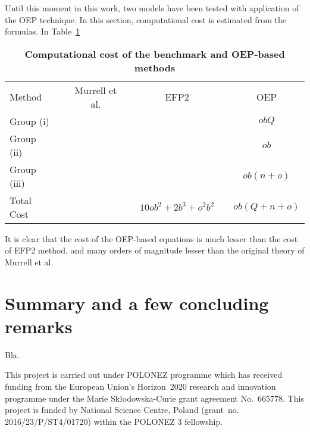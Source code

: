 Until this moment in this work, two models have been tested with application of the OEP technique.
In this section, computational cost is estimated from the formulas.
In
Table~\ref{t:oep-costs} 
%
{
\renewcommand{\arraystretch}{1.4}
\begin{table}[b]
\caption[Computational cost of the benchmark and OEP-based methods: calculation of coupling constant]
{{\bf Computational cost of the benchmark and OEP-based methods\footnotemark[1]}
}
\label{t:oep-costs}
\begin{ruledtabular}
\begin{tabular}{lcccccc}
Method             && Murrell et al. &&    EFP2        &&      OEP     \\ 
	\cline{1-7}
Group (i)         &&  &&        &&   $obQ$     \\
Group (ii)        &&  &&        &&   $ob$      \\
Group (iii)       &&  &&        &&   $ob(n+o)$     \\
Total Cost        &&  && $10ob^2 + 2b^3 + o^2b^2$       &&   $ob(Q+n+o)$     \\
\end{tabular}
\end{ruledtabular}
%
%
\end{table}
}
%
It is clear that the cost of the OEP\hyp{}based equations is much lesser than the cost of EFP2 method,
and many orders of magnitude lesser than the original theory of Murrell et al.


\section{\label{s:6}Summary and a few concluding remarks}

Bla.

\begin{acknowledgments}
This project is carried out under POLONEZ programme which has received funding from the European Union's
Horizon~2020 research and innovation programme under the Marie Skłodowska-Curie grant agreement 
No.~665778. This project is funded by National Science Centre, Poland 
(grant~no. 2016/23/P/ST4/01720) within the POLONEZ 3 fellowship.
\end{acknowledgments}

\appendix

